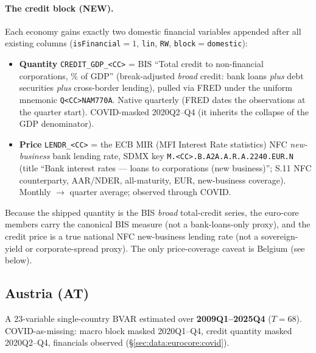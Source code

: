 \paragraph{The credit block (NEW).}
Each economy gains exactly two domestic financial variables appended after all
existing columns (\texttt{isFinancial}$=1$, \texttt{lin}, \texttt{RW},
\texttt{block}$=$\texttt{domestic}):
\begin{itemize}[leftmargin=1.4em,itemsep=1pt,topsep=2pt]
  \item \textbf{Quantity} \texttt{CREDIT\_GDP\_<CC>} = BIS ``Total credit to
        non-financial corporations, \% of GDP'' (break-adjusted \emph{broad}
        credit: bank loans \emph{plus} debt securities \emph{plus}
        cross-border lending), pulled via FRED under the uniform mnemonic
        \texttt{Q<CC>NAM770A}. Native quarterly (FRED dates the observations at
        the quarter start). COVID-masked 2020Q2--Q4 (it inherits the collapse
        of the GDP denominator).
  \item \textbf{Price} \texttt{LENDR\_<CC>} = the ECB MIR (MFI Interest Rate
        statistics) NFC \emph{new-business} bank lending rate, SDMX key
        \texttt{M.<CC>.\allowbreak B.\allowbreak A2A.\allowbreak A.\allowbreak R.\allowbreak A.2240.\allowbreak EUR.\allowbreak N} (title ``Bank interest rates ---
        loans to corporations (new business)''; S.11 NFC counterparty,
        AAR/NDER, all-maturity, EUR, new-business coverage). Monthly $\to$
        quarter average; observed through COVID.
\end{itemize}
Because the shipped quantity is the BIS \emph{broad} total-credit series, the
euro-core members carry the canonical BIS measure (not a bank-loans-only
proxy), and the credit price is a true national NFC new-business lending rate
(not a sovereign-yield or corporate-spread proxy). The only price-coverage
caveat is Belgium (see below).

\subsection{Austria (AT)}
\label{sec:data:AT}

A 23-variable single-country BVAR estimated over \textbf{2009Q1--2025Q4}
($T=68$). COVID-as-missing: macro block masked 2020Q1--Q4, credit quantity
masked 2020Q2--Q4, financials observed (\S\ref{sec:data:eurocore:covid}).


